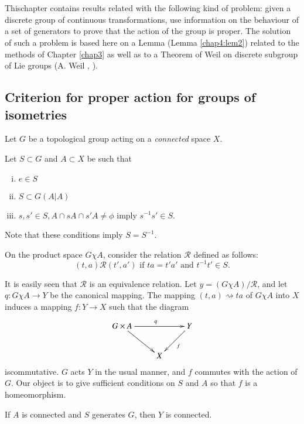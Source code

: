 \chapter{}\label{chap4}%

This\pageoriginale chapter contains results related with the following kind of
problem: given a discrete group  of continuous transformations, use
information on the behaviour of a set of generators to prove that the
action of the group is proper. The solution of such a problem is based
here on a Lemma (Lemma \ref{chap4:lem2}) related to the methods of Chapter
\ref{chap3} as well as to a Theorem of Weil on discrete subgroup of
Lie groups (A. Weil \cite{key1}, \cite{key2}).   

\section{Criterion for proper action for groups of isometries}%

Let $G$ be a topological group acting on a \textit{connected} space $X$.

Let $S \subset G$ and $A \subset X$ be such that 
\begin{enumerate}[(i)]
\item $e \in S$
\item $S \subset G(A|A)$
\item $s, s' \in  S,  A\cap sA  \cap s' A \neq \phi$ imply $s^{-1} s' \in S$.
\end{enumerate}

Note that these conditions imply $S=S^{-1}$. 

On the product space $G \chi A$, consider the relation  $\mathscr{R}$
defined as follows: 
$$
(t,a) \mathscr{R} (t', a') \text{ if } ta= t' a' \text{ and } t^{-1}t'
\in S. 
$$

It is easily seen that $\mathscr{R}$ is an equivalence relation. Let
$y = (G \chi A)/ \mathscr{R}$, and let $q: G \chi A \to Y$ be the
canonical mapping. The mapping $(t,a) \rightsquigarrow ta $ of $G
\chi A$ into $X$ induces a mapping $f: Y \to X$ such that the diagram 
\[
\xymatrix{G \times A \ar[dr]  \ar[rr]^q && Y \ar[dl]^f  \\
& X &   
}
\]
is\pageoriginale commutative. $G$ acts $Y$ in the usual manner, and $f$ commutes
with the action of $G$. Our object is to give sufficient conditions on
$S$ and $A$ so that $f$ is a homeomorphism. 

\setcounter{lem}{0}
\begin{lem}\label{chap4:lem1}%
  If $A$ is connected and $S$ generates $G$, then $Y$ is connected.
\end{lem}


